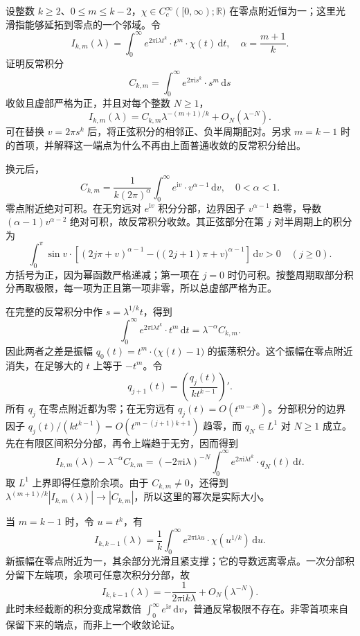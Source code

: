 \begin{exercise}\label{b2:ex:21-new-2}
设整数 \(k\geq2\)、\(0\leq m\leq k-2\)，\(\chi\in C_c^\infty([0,\infty);\mathbb R)\) 在零点附近恒为一；这里光滑指能够延拓到零点的一个邻域。令
\[
 I_{k,m}(\lambda)=\int_0^\infty
       e^{2\pi\mathrm i\lambda t^k}\cdot t^m\cdot\chi(t)\,\mathrm dt,
 \quad \alpha=\frac{m+1}{k}.
\]
证明反常积分
\[
 C_{k,m}=\int_0^\infty e^{2\pi\mathrm i s^k}\cdot s^m\,\mathrm ds
\]
收敛且虚部严格为正，并且对每个整数 \(N\geq1\)，
\[
 I_{k,m}(\lambda)
 =C_{k,m}\lambda^{-(m+1)/k}+O_N(\lambda^{-N}).
\]
可在替换 \(v=2\pi s^k\) 后，将正弦积分的相邻正、负半周期配对。另求 \(m=k-1\) 时的首项，并解释这一端点为什么不再由上面普通收敛的反常积分给出。
\end{exercise}
\begin{solution}
换元后，
\[
 C_{k,m}=\frac1{k(2\pi)^\alpha}
          \int_0^\infty e^{\mathrm iv}\cdot v^{\alpha-1}\,\mathrm dv,
 \quad 0<\alpha<1.
\]
零点附近绝对可积。在无穷远对 \(e^{\mathrm iv}\) 积分分部，边界因子 \(v^{\alpha-1}\) 趋零，导数 \((\alpha-1)v^{\alpha-2}\) 绝对可积，故反常积分收敛。其正弦部分在第 \(j\) 对半周期上的积分为
\[
 \int_0^\pi\sin v\cdot
 \left[(2j\pi+v)^{\alpha-1}
       -\bigl((2j+1)\pi+v\bigr)^{\alpha-1}\right]\,\mathrm dv>0
 \quad(j\geq0).
\]
方括号为正，因为幂函数严格递减；第一项在 \(j=0\) 时仍可积。按整周期取部分积分再取极限，每一项为正且第一项非零，所以总虚部严格为正。

在完整的反常积分中作 \(s=\lambda^{1/k}t\)，得到
\[
 \int_0^\infty e^{2\pi\mathrm i\lambda t^k}\cdot t^m\,\mathrm dt
       =\lambda^{-\alpha}C_{k,m}.
\]
因此两者之差是振幅 \(q_0(t)=t^m\cdot\bigl(\chi(t)-1\bigr)\) 的振荡积分。这个振幅在零点附近消失，在足够大的 \(t\) 上等于 \(-t^m\)。令
\[
 q_{j+1}(t)=\left(\frac{q_j(t)}{kt^{k-1}}\right)'.
\]
所有 \(q_j\) 在零点附近都为零；在无穷远有
\(q_j(t)=O(t^{m-jk})\)。分部积分的边界因子
\(q_j(t)/(kt^{k-1})=O(t^{m-(j+1)k+1})\)
趋零，而 \(q_N\in L^1\) 对 \(N\geq1\) 成立。先在有限区间积分分部，再令上端趋于无穷，因而得到
\[
 I_{k,m}(\lambda)-\lambda^{-\alpha}C_{k,m}
 =(-2\pi\mathrm i\lambda)^{-N}
       \int_0^\infty e^{2\pi\mathrm i\lambda t^k}\cdot q_N(t)\,\mathrm dt.
\]
取 \(L^1\) 上界即得任意阶余项。由于 \(C_{k,m}\ne0\)，还得到
\(\lambda^{(m+1)/k}|I_{k,m}(\lambda)|\to|C_{k,m}|\)，所以这里的幂次是实际大小。

当 \(m=k-1\) 时，令 \(u=t^k\)，有
\[
 I_{k,k-1}(\lambda)
 =\frac1k\int_0^\infty e^{2\pi\mathrm i\lambda u}
                         \cdot\chi(u^{1/k})\,\mathrm du.
\]
新振幅在零点附近为一，其余部分光滑且紧支撑；它的导数远离零点。一次分部积分留下左端项，余项可任意次积分分部，故
\[
 I_{k,k-1}(\lambda)
 =-\frac1{2\pi\mathrm i k\lambda}+O_N(\lambda^{-N}).
\]
此时未经截断的积分变成常数倍 \(\int_0^\infty e^{\mathrm iv}\,\mathrm dv\)，普通反常极限不存在。非零首项来自保留下来的端点，而非上一个收敛论证。
\end{solution}

